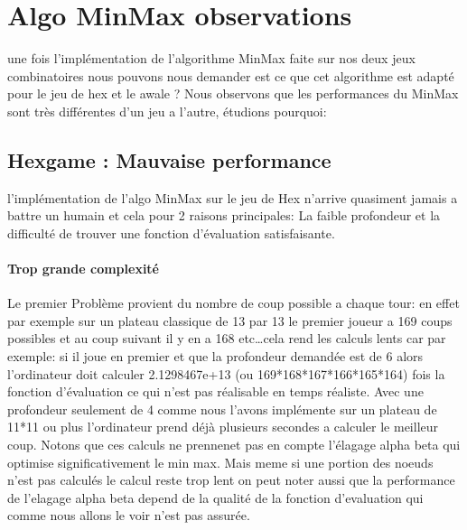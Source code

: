 




\section{Algo MinMax observations}
une fois l'implémentation de l'algorithme MinMax faite sur nos deux
jeux combinatoires nous pouvons nous demander est ce que cet algorithme est adapté pour le jeu de hex et le awale ?
Nous observons que les performances du MinMax sont très différentes d'un jeu a l'autre, étudions pourquoi:

\subsection {Hexgame : Mauvaise performance}
l'implémentation de l'algo MinMax sur le jeu de Hex n'arrive quasiment jamais a battre un humain et cela pour 
2 raisons principales: La faible profondeur et la difficulté de trouver une fonction d'évaluation satisfaisante.
\paragraph {Trop grande complexité} Le premier Problème provient du nombre de coup possible a chaque tour: 
en effet par exemple sur un plateau classique de 13 par 13 le premier joueur a 169 coups possibles et au coup suivant
il y en a 168 etc\dots cela rend les calculs lents car par exemple: si il joue en premier 
et que la profondeur demandée est de 6 alors l'ordinateur doit calculer 2.1298467e+13 (ou 169*168*167*166*165*164) 
fois la fonction d'évaluation ce qui n'est pas réalisable en temps réaliste. Avec une profondeur seulement de 
4 comme nous l'avons implémente sur un plateau de 11*11 ou plus l'ordinateur prend déjà plusieurs 
secondes a calculer le meilleur coup. Notons que ces calculs ne prennenet pas en compte l'élagage alpha beta
qui optimise significativement le min max. Mais meme si une portion des noeuds n'est pas calculés le calcul reste trop lent
on peut noter aussi que la performance de l'elagage alpha beta depend de la qualité de la fonction d'evaluation qui comme nous allons
le voir n'est pas assurée.

